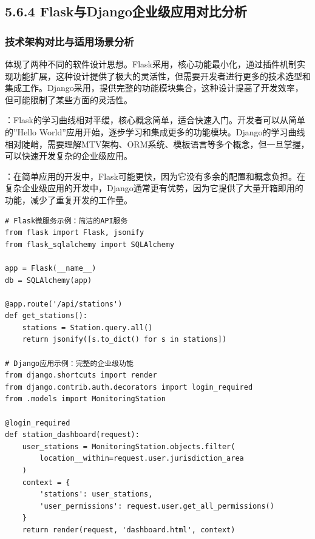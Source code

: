 \hypertarget{flaskux4e0edjangoux4f01ux4e1aux7ea7ux5e94ux7528ux5bf9ux6bd4ux5206ux6790}{%
\subsection{5.6.4 Flask与Django企业级应用对比分析}\label{flaskux4e0edjangoux4f01ux4e1aux7ea7ux5e94ux7528ux5bf9ux6bd4ux5206ux6790}}

\hypertarget{ux6280ux672fux67b6ux6784ux5bf9ux6bd4ux4e0eux9002ux7528ux573aux666fux5206ux6790}{%
\subsubsection{技术架构对比与适用场景分析}\label{ux6280ux672fux67b6ux6784ux5bf9ux6bd4ux4e0eux9002ux7528ux573aux666fux5206ux6790}}

体现了两种不同的软件设计思想。Flask采用，核心功能最小化，通过插件机制实现功能扩展，这种设计提供了极大的灵活性，但需要开发者进行更多的技术选型和集成工作。Django采用，提供完整的功能模块集合，这种设计提高了开发效率，但可能限制了某些方面的灵活性。

：Flask的学习曲线相对平缓，核心概念简单，适合快速入门。开发者可以从简单的''Hello World''应用开始，逐步学习和集成更多的功能模块。Django的学习曲线相对陡峭，需要理解MTV架构、ORM系统、模板语言等多个概念，但一旦掌握，可以快速开发复杂的企业级应用。

：在简单应用的开发中，Flask可能更快，因为它没有多余的配置和概念负担。在复杂企业级应用的开发中，Django通常更有优势，因为它提供了大量开箱即用的功能，减少了重复开发的工作量。

\begin{lstlisting}[style=python]
# Flask微服务示例：简洁的API服务
from flask import Flask, jsonify
from flask_sqlalchemy import SQLAlchemy

app = Flask(__name__)
db = SQLAlchemy(app)

@app.route('/api/stations')
def get_stations():
    stations = Station.query.all()
    return jsonify([s.to_dict() for s in stations])

# Django应用示例：完整的企业级功能
from django.shortcuts import render
from django.contrib.auth.decorators import login_required
from .models import MonitoringStation

@login_required
def station_dashboard(request):
    user_stations = MonitoringStation.objects.filter(
        location__within=request.user.jurisdiction_area
    )
    context = {
        'stations': user_stations,
        'user_permissions': request.user.get_all_permissions()
    }
    return render(request, 'dashboard.html', context)
\end{lstlisting}

